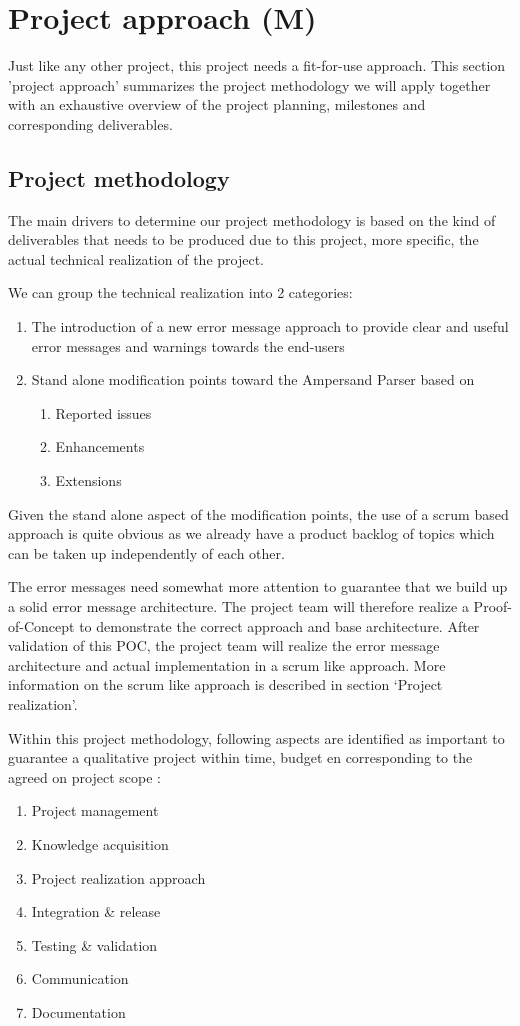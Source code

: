 \section{Project approach (M)}
\label{sec:project-approach}
Just like any other project, this project needs a fit-for-use approach. 
This section 'project approach' summarizes the project methodology we will apply together with an exhaustive overview of the project planning, milestones and corresponding deliverables.
\subsection{Project methodology}
The main drivers to determine our project methodology is based on the kind of deliverables that needs to be produced due to this project, more specific, the actual technical realization of the project.

We can group the technical realization into 2 categories:
\begin{enumerate}
	\item The introduction of a new error message approach to provide clear and useful error messages and warnings towards the end-users
	\item Stand alone modification points toward the Ampersand Parser based on
	\begin{enumerate}
		\item Reported issues
		\item Enhancements
		\item Extensions
	\end {enumerate}
\end {enumerate}

Given the stand alone aspect of the modification points, the use of a scrum based approach is quite obvious as we already have a product backlog of topics which can be taken up independently of each other. 


The error messages need somewhat more attention to guarantee that we build up a solid error message architecture. 
The project team will therefore realize a Proof-of-Concept to demonstrate the correct approach and base architecture. 
After validation of this POC, the project team will realize the error message architecture and actual implementation in a scrum like approach.
More information on the scrum like approach is described in section ‘Project realization’.



Within this project methodology, following aspects are identified as important to guarantee a qualitative project within time, budget en corresponding to the agreed on project scope : 
\begin{enumerate}
	\item Project management
	\item Knowledge acquisition 
	\item Project realization approach
	\item Integration \& release
	\item Testing \& validation
	\item Communication
	\item Documentation
\end {enumerate}

